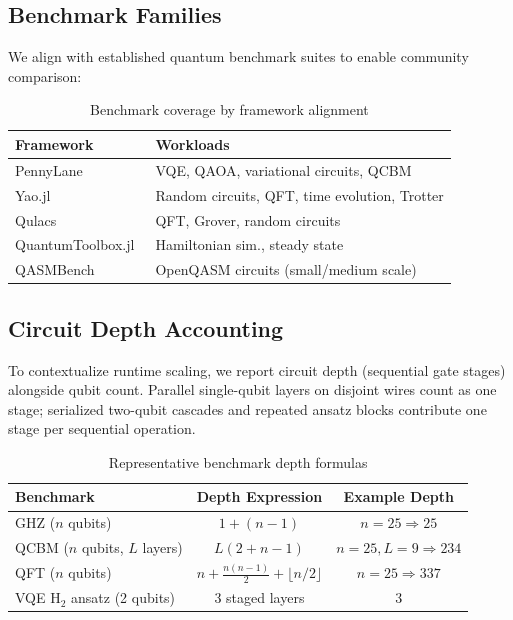 \documentclass[runningheads]{llncs}
\begin{document}
\subsection{Benchmark Families}

We align with established quantum benchmark suites to enable community comparison:

\begin{table}[t]
\caption{Benchmark coverage by framework alignment}
\label{tab:coverage}
\centering
\begin{tabular}{ll}
\toprule
Framework & Workloads \\
\midrule
PennyLane~\cite{PennyLane2022} & VQE, QAOA, variational circuits, QCBM \\
Yao.jl~\cite{YaoJL2024} & Random circuits, QFT, time evolution, Trotter \\
Qulacs~\cite{Qulacs} & QFT, Grover, random circuits \\
QuantumToolbox.jl~\cite{QuantumToolboxJulia2024} & Hamiltonian sim., steady state \\
QASMBench~\cite{QASMBench2020} & OpenQASM circuits (small/medium scale) \\
\bottomrule
\end{tabular}
\end{table}

\subsection{Circuit Depth Accounting}

To contextualize runtime scaling, we report circuit depth (sequential gate stages) alongside qubit count. Parallel single-qubit layers on disjoint wires count as one stage; serialized two-qubit cascades and repeated ansatz blocks contribute one stage per sequential operation.

\begin{table}[t]
\caption{Representative benchmark depth formulas}
\label{tab:benchmark-depth}
\centering
\footnotesize
\begin{tabular}{lcc}
\toprule
Benchmark & Depth Expression & Example Depth \\
\midrule
GHZ ($n$ qubits) & $1 + (n-1)$ & $n=25 \Rightarrow 25$ \\
QCBM ($n$ qubits, $L$ layers) & $L(2 + n-1)$ & $n=25, L=9 \Rightarrow 234$ \\
QFT ($n$ qubits) & $n + \frac{n(n-1)}{2} + \lfloor n/2 \rfloor$ & $n=25 \Rightarrow 337$ \\
VQE H$_2$ ansatz (2 qubits) & 3 staged layers & 3 \\
\bottomrule
\end{tabular}
\end{table}
\end{document}
